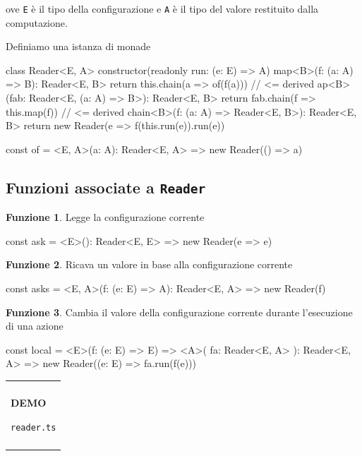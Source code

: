 \documentclass[12pt]{article}
\theoremstyle{definition}
\newtheorem{function}{Funzione}[section]
\newenvironment{demo}
    {\begin{center}
    \begin{tabular}{|p{0.9\textwidth}|}
    \hline\\
    }
    {
    \\\\\hline
    \end{tabular}
    \end{center}
    }
\newenvironment{code}
  {\vspace{0.5cm} \VerbatimEnvironment\begin{typescriptcode}}
  {\end{typescriptcode} \vspace{0.2cm}}
\begin{document}
ove \texttt{E} è il tipo della configurazione e \texttt{A} è il tipo del valore restituito dalla computazione.

Definiamo una istanza di monade

\begin{code}
class Reader<E, A> {
  constructor(readonly run: (e: E) => A) {}
  map<B>(f: (a: A) => B): Reader<E, B> {
    return this.chain(a => of(f(a))) // <= derived
  }
  ap<B>(fab: Reader<E, (a: A) => B>): Reader<E, B> {
    return fab.chain(f => this.map(f)) // <= derived
  }
  chain<B>(f: (a: A) => Reader<E, B>): Reader<E, B> {
    return new Reader(e => f(this.run(e)).run(e))
  }
}

const of = <E, A>(a: A): Reader<E, A> =>
  new Reader(() => a)
\end{code}

\subsection{Funzioni associate a \texttt{Reader}}

\begin{function}
Legge la configurazione corrente

\begin{code}
const ask = <E>(): Reader<E, E> => new Reader(e => e)
\end{code}
\end{function}

\begin{function}
Ricava un valore in base alla configurazione corrente

\begin{code}
const asks = <E, A>(f: (e: E) => A): Reader<E, A> =>
  new Reader(f)

\end{code}
\end{function}

\begin{function}
Cambia il valore della configurazione corrente durante l'esecuzione di una azione

\begin{code}
const local = <E>(f: (e: E) => E) => <A>(
  fa: Reader<E, A>
): Reader<E, A> => new Reader((e: E) => fa.run(f(e)))
\end{code}
\end{function}

\begin{demo}
\begin{center}
\textbf{DEMO}

\texttt{reader.ts}
\end{center}
\end{demo}
\end{document}
